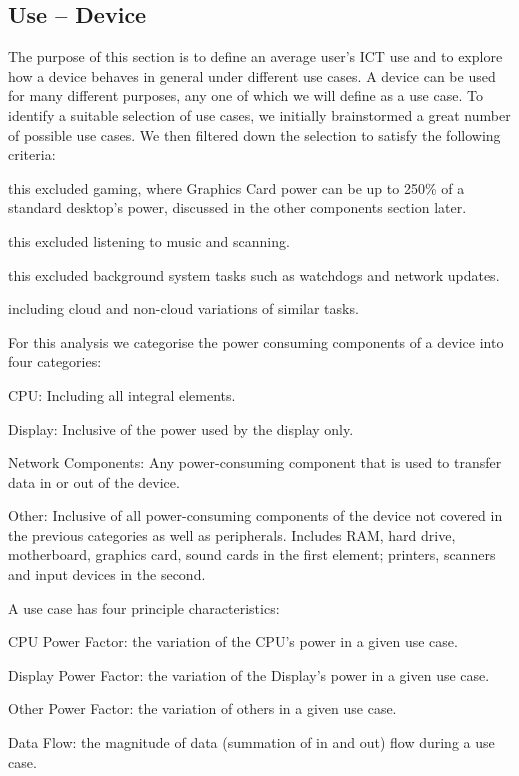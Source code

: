 \documentclass[conference]{IEEEtran}
\begin{document}
\subsection{Use -- Device}

The purpose of this section is to define an average user's ICT use and
to explore how a device behaves in general under different use cases.
A device can be used for many different purposes, any one of which we
will define as a use case.  To identify a suitable selection of use
cases, we initially brainstormed a great number of possible use
cases. We then filtered down the selection to satisfy the following
criteria:

 this excluded gaming, where Graphics Card power
can be up to 250\% of a standard desktop’s power, discussed in the
other components section later.

 this
excluded listening to music and scanning.

 this excluded background system tasks such as
watchdogs and network updates.

 including cloud
and non-cloud variations of similar tasks.

For this analysis we categorise the power consuming components of
a device into four categories:

\begin{compactitem}
\item CPU: Including all integral elements.
\item Display: Inclusive of the power used by the display only.
\item Network Components: Any power-consuming component that is used to transfer data in or out of the device.
\item Other: Inclusive of all power-consuming components
  of the device not covered in the previous categories as well as
  peripherals. Includes RAM, hard drive, motherboard, graphics
  card, sound cards in the first element; printers, scanners and input
  devices in the second.
\end{compactitem}

A use case has four principle characteristics:

\begin{compactitem}
\item CPU Power Factor: the variation of the CPU’s power in a given use case.
\item Display Power Factor: the variation of the Display’s power in a given use case.
\item Other Power Factor: the variation of others in a given use case.
\item Data Flow: the magnitude of data (summation of in and out) flow during a use case.
\end{compactitem}
\end{document}
